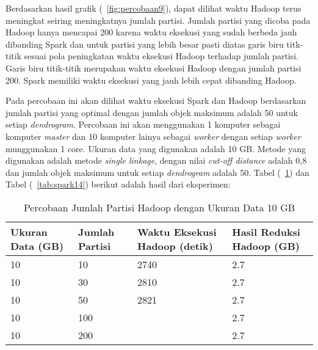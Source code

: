 Berdasarkan hasil grafik (~\ref{fig:percobaan9}), dapat dilihat waktu Hadoop terus meningkat seiring meningkatnya jumlah partisi. Jumlah partisi yang dicoba pada Hadoop hanya mencapai 200 karena waktu eksekusi yang sudah berbeda jauh dibanding Spark dan untuk partisi yang lebih besar pasti diatas garis biru titk-titik sesuai pola peningkatan waktu eksekusi Hadoop terhadap jumlah partisi. Garis biru titik-titik merupakan waktu eksekusi Hadoop dengan jumlah partisi 200. Spark memiliki waktu eksekusi yang jauh lebih cepat dibanding Hadoop.  



Pada percobaan ini akan dilihat waktu eksekusi Spark dan Hadoop berdasarkan jumlah partisi yang optimal dengan jumlah objek maksimum adalah 50 untuk setiap \textit{dendrogram}. Percobaan ini akan menggunakan 1 komputer sebagai komputer \textit{master} dan 10 komputer lainya sebagai \textit{worker} dengan setiap \textit{worker} munggunakan 1 core. Ukuran data yang digunakan adalah 10 GB. Metode yang digunakan adalah metode \textit{single linkage}, dengan nilai \textit{cut-off distance} adalah 0,8 dan jumlah objek maksimum untuk setiap \textit{dendrogram} adalah 50. Tabel (~\ref{tab:spark13}) dan Tabel (~\ref{tab:spark14}) berikut adalah hasil dari eksperimen:





\begin{table}[H] 
	\centering 
	\caption{Percobaan Jumlah Partisi Hadoop dengan Ukuran Data 10 GB}
	\label{tab:spark13}
	\begin{tabular}{|p{3cm}|p{3cm}|p{4cm}|p{4cm}|}
\hline
Ukuran Data (GB) & Jumlah Partisi &  Waktu Eksekusi Hadoop (detik) & Hasil Reduksi Hadoop (GB)\\
\hline
10 & 10 & 2740  & 2.7  \\
\hline
10 & 30 & 2810  & 2.7  \\
\hline
10 & 50 & 2821  & 2.7   \\
\hline
10 & 100 &   & 2.7   \\
\hline
10 & 200 &   & 2.7   \\
\hline


\hline

	\end{tabular} 
\end{table}




